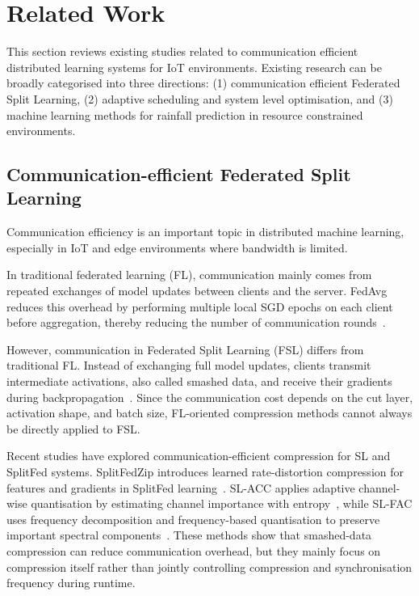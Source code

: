 \documentclass[conference]{IEEEtran}
\begin{document}
\section{Related Work}
\label{sec:RelatedWork}
This section reviews existing studies related to communication efficient distributed learning systems for IoT environments. Existing research can be broadly categorised into three directions: (1) communication efficient Federated Split Learning, (2) adaptive scheduling and system level optimisation, and (3) machine learning methods for rainfall prediction in resource constrained environments.

\subsection{Communication-efficient Federated Split Learning}
Communication efficiency is an important topic in distributed machine learning, especially in IoT and edge environments where bandwidth is limited.

In traditional federated learning (FL), communication mainly comes from repeated exchanges of model updates between clients and the server. FedAvg reduces this overhead by performing multiple local SGD epochs on each client before aggregation, thereby reducing the number of communication rounds~\cite{pmlr-v54-mcmahan17a}.


However, communication in Federated Split Learning (FSL) differs from traditional FL. Instead of exchanging full model updates, clients transmit intermediate activations, also called smashed data, and receive their gradients during backpropagation~\cite{vepakomma2018splitlearninghealthdistributed,thapa2022splitfedfederatedlearningmeets}. Since the communication cost depends on the cut layer, activation shape, and batch size, FL-oriented compression methods cannot always be directly applied to FSL.

Recent studies have explored communication-efficient compression for SL and SplitFed systems. SplitFedZip introduces learned rate-distortion compression for features and gradients in SplitFed learning~\cite{shiranthika2024splitfedziplearnedcompressiondata}. SL-ACC applies adaptive channel-wise quantisation by estimating channel importance with entropy~\cite{11458714}, while SL-FAC uses frequency decomposition and frequency-based quantisation to preserve important spectral components~\cite{lin2026slfaccommunicationefficientsplitlearning}. These methods show that smashed-data compression can reduce communication overhead, but they mainly focus on compression itself rather than jointly controlling compression and synchronisation frequency during runtime.
\end{document}
